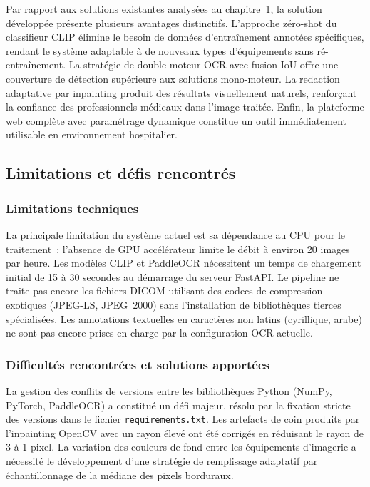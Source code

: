 Par rapport aux solutions existantes analysées au chapitre~1, la solution développée présente plusieurs avantages distinctifs. L'approche zéro-shot du classifieur CLIP élimine le besoin de données d'entraînement annotées spécifiques, rendant le système adaptable à de nouveaux types d'équipements sans ré-entraînement. La stratégie de double moteur OCR avec fusion IoU offre une couverture de détection supérieure aux solutions mono-moteur. La redaction adaptative par inpainting produit des résultats visuellement naturels, renforçant la confiance des professionnels médicaux dans l'image traitée. Enfin, la plateforme web complète avec paramétrage dynamique constitue un outil immédiatement utilisable en environnement hospitalier.

\subsection{Limitations et défis rencontrés}

\subsubsection{Limitations techniques}

La principale limitation du système actuel est sa dépendance au CPU pour le traitement~: l'absence de GPU accélérateur limite le débit à environ 20 images par heure. Les modèles CLIP et PaddleOCR nécessitent un temps de chargement initial de 15 à 30 secondes au démarrage du serveur FastAPI. Le pipeline ne traite pas encore les fichiers DICOM utilisant des codecs de compression exotiques (JPEG-LS, JPEG~2000) sans l'installation de bibliothèques tierces spécialisées. Les annotations textuelles en caractères non latins (cyrillique, arabe) ne sont pas encore prises en charge par la configuration OCR actuelle.

\subsubsection{Difficultés rencontrées et solutions apportées}

La gestion des conflits de versions entre les bibliothèques Python (NumPy, PyTorch, PaddleOCR) a constitué un défi majeur, résolu par la fixation stricte des versions dans le fichier \texttt{requirements.txt}. Les artefacts de coin produits par l'inpainting OpenCV avec un rayon élevé ont été corrigés en réduisant le rayon de 3 à 1 pixel. La variation des couleurs de fond entre les équipements d'imagerie a nécessité le développement d'une stratégie de remplissage adaptatif par échantillonnage de la médiane des pixels borduraux.

